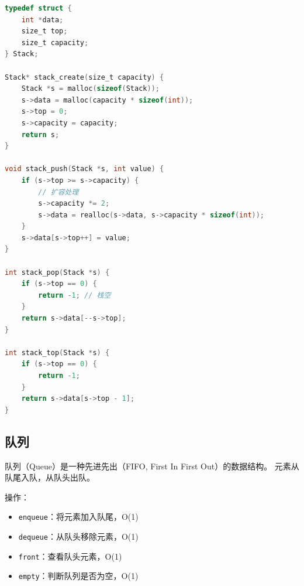 \begin{lstlisting}[language=C, caption={栈的数组实现}]
typedef struct {
    int *data;
    size_t top;
    size_t capacity;
} Stack;

Stack* stack_create(size_t capacity) {
    Stack *s = malloc(sizeof(Stack));
    s->data = malloc(capacity * sizeof(int));
    s->top = 0;
    s->capacity = capacity;
    return s;
}

void stack_push(Stack *s, int value) {
    if (s->top >= s->capacity) {
        // 扩容处理
        s->capacity *= 2;
        s->data = realloc(s->data, s->capacity * sizeof(int));
    }
    s->data[s->top++] = value;
}

int stack_pop(Stack *s) {
    if (s->top == 0) {
        return -1; // 栈空
    }
    return s->data[--s->top];
}

int stack_top(Stack *s) {
    if (s->top == 0) {
        return -1;
    }
    return s->data[s->top - 1];
}
\end{lstlisting}

\subsection{队列}


队列（Queue）是一种先进先出（FIFO, First In First Out）的数据结构。
元素从队尾入队，从队头出队。

操作：
\begin{itemize}
  \item \texttt{enqueue}：将元素加入队尾，O(1)
  \item \texttt{dequeue}：从队头移除元素，O(1)
  \item \texttt{front}：查看队头元素，O(1)
  \item \texttt{empty}：判断队列是否为空，O(1)
\end{itemize}

